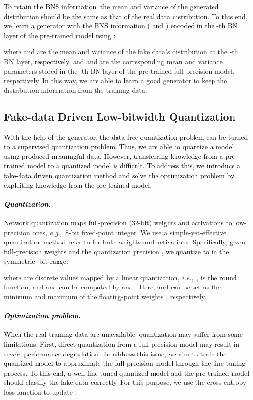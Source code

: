 \documentclass[runningheads]{llncs}
\def\eg{\emph{e.g}\onedot}
\def\ie{\emph{i.e}\onedot}
\def\ie{\mbox{\textit{i.e.}, }}
\def\eg{\mbox{\textit{e.g.}, }}
\def\xsk{\textcolor{black}}
\def\jie{\textcolor{black}}
\def\wrong{\textcolor{black}}
\def\new{\textcolor{black}}
\begin{document}
\jie{
To retain the BNS information, the mean and variance of the generated distribution should be the same as that of the real data distribution.}
\jie{
To this end, we learn a generator  with the BNS information ( and ) encoded in the -th BN layer of the pre-trained model using :
}

where  and  are the mean and variance of the fake data’s distribution at the -th BN layer, \new{respectively,} and  and  are the corresponding mean and variance parameters stored in the -th BN layer of the pre-trained full-precision model\new{, respectively}.
In this way, we are able to \new{learn} a good generator to keep the distribution information from the training data.

\subsection{Fake-data Driven Low-bitwidth Quantization}
\label{finetune}

\jie{With the help of the generator, 
the data-free quantization problem can be turned to a supervised quantization problem.
Thus, we are able to quantize a model using produced meaningful data. 
However, \new{transferring} knowledge from a pre-trained model to a quantized model is difficult.
To address this, we introduce a fake-data driven quantization method and solve the optimization problem by \new{exploiting} knowledge from the pre-trained model. 
}

\paragraph{\textbf{\emph{\jie{Quantization.}}}}

Network quantization maps full-precision (32-bit) weights and activations to low-precision ones, \eg 8-bit fixed-point integer. 
We use a simple-yet-effective quantization method refer to \cite{jacob2018quantization} for both weights and activations.
\xsk{Specifically, given full-precision weights  and the quantization precision , we quantize  to  in the symmetric -bit range:}

where  are discrete values mapped by a linear quantization, \ie ,
 is the round function,
and  and  can be computed by
 and .
Here,  and  can be set as the minimum and maximum of the floating-point weights , respectively.


\paragraph{\emph{\textbf{\wrong{Optimization problem.}}}}
\jie{
When the real training data are unavailable, quantization may suffer from some limitations.
First, \new{direct quantization} from a full-precision model may result in severe performance degradation.
To address this issue, we aim to train the quantized model to approximate the full-precision model through the fine-tuning process.
To this end, a well fine-tuned quantized model  and the pre-trained model  should classify the fake data correctly.
}
For this purpose, we use the cross-entropy loss function  to update :
\end{document}
